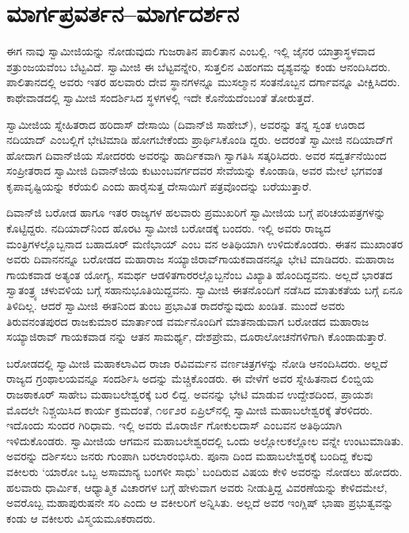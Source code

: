 
\chapter{ಮಾರ್ಗಪ್ರವರ್ತನ–ಮಾರ್ಗದರ್ಶನ}

\noindent

ಈಗ ನಾವು ಸ್ವಾಮೀಜಿಯನ್ನು ನೋಡುವುದು ಗುಜರಾತಿನ ಪಾಲಿತಾನ ಎಂಬಲ್ಲಿ. ಇಲ್ಲಿ ಜೈನರ ಯಾತ್ರಾಸ್ಥಳವಾದ ಶತ್ರುಂಜಯವೆಂಬ ಬೆಟ್ಟವಿದೆ. ಸ್ವಾಮೀಜಿ ಈ ಬೆಟ್ಟವನ್ನೇರಿ, ಸುತ್ತಲಿನ ವಿಹಂಗಮ ದೃಶ್ಯವನ್ನು ಕಂಡು ಆನಂದಿಸಿದರು. ಪಾಲಿತಾನದಲ್ಲಿ ಅವರು ಇತರ ಹಲವಾರು ದೇವ ಸ್ಥಾನಗಳನ್ನೂ ಮುಸಲ್ಮಾನ ಸಂತನೊಬ್ಬನ ದರ್ಗಾವನ್ನೂ ವೀಕ್ಷಿಸಿದರು. ಕಾಥೇವಾಡದಲ್ಲಿ ಸ್ವಾಮೀಜಿ ಸಂದರ್ಶಿಸಿದ ಸ್ಥಳಗಳಲ್ಲಿ ಇದೇ ಕೊನೆಯದೆಂಬಂತೆ ತೋರುತ್ತದೆ.

ಸ್ವಾಮೀಜಿಯ ಸ್ನೇಹಿತರಾದ ಹರಿದಾಸ್ ದೇಸಾಯಿ (ದಿವಾನ್​ಜಿ ಸಾಹೇಬ್​), ಅವರನ್ನು ತನ್ನ ಸ್ವಂತ ಊರಾದ ನದಿಯಾದ್ ಎಂಬಲ್ಲಿಗೆ ಭೇಟಿಮಾಡಿ ಹೋಗಬೇಕೆಂದು ಪ್ರಾರ್ಥಿಸಿಕೊಂಡಿ ದ್ದರು. ಅದರಂತೆ ಸ್ವಾಮೀಜಿ ನದಿಯಾದ್​ಗೆ ಹೋದಾಗ ದಿವಾನ್​ಜಿಯ ಸೋದರರು ಅವರನ್ನು ಹಾರ್ದಿಕವಾಗಿ ಸ್ವಾಗತಿಸಿ ಸತ್ಕರಿಸಿದರು. ಅವರ ಸದ್ವರ್ತನೆಯಿಂದ ಸಂಪ್ರೀತರಾದ ಸ್ವಾಮೀಜಿ ದಿವಾನ್​ಜಿಯ ಕುಟುಂಬವರ್ಗದವರ ಸೇವೆಯನ್ನು ಕೊಂಡಾಡಿ, ಅವರ ಮೇಲೆ ಭಗವಂತ ಕೃಪಾವೃಷ್ಟಿಯನ್ನು ಕರೆಯಲಿ ಎಂದು ಹಾರೈಸುತ್ತ ದೇಸಾಯಿಗೆ ಪತ್ರವೊಂದನ್ನು ಬರೆಯುತ್ತಾರೆ.

ದಿವಾನ್​ಜಿ ಬರೋಡ ಹಾಗೂ ಇತರ ರಾಜ್ಯಗಳ ಹಲವಾರು ಪ್ರಮುಖರಿಗೆ ಸ್ವಾಮೀಜಿಯ ಬಗ್ಗೆ ಪರಿಚಯಪತ್ರಗಳನ್ನು ಕೊಟ್ಟಿದ್ದರು. ನದಿಯಾದ್​ನಿಂದ ಹೊರಟ ಸ್ವಾಮೀಜಿ ಬರೋಡಕ್ಕೆ ಬಂದರು. ಇಲ್ಲಿ ಅವರು ರಾಜ್ಯದ ಮಂತ್ರಿಗಳಲ್ಲೊಬ್ಬನಾದ ಬಹಾದೂರ್ ಮಣಿಭಾಯ್ ಎಂಬ ವನ ಅತಿಥಿಯಾಗಿ ಉಳಿದುಕೊಂಡರು. ಈತನ ಮುಖಾಂತರ ಅವರು ದಿವಾನನನ್ನೂ ಬರೋಡದ ಮಹಾರಾಜ ಸಯ್ಯಾಜಿರಾವ್​ಗಾಯಕವಾಡನನ್ನೂ ಭೇಟಿ ಮಾಡಿದರು. ಮಹಾರಾಜ ಗಾಯಕವಾಡ ಅತ್ಯಂತ ಯೋಗ್ಯ, ಸಮರ್ಥ ಆಡಳಿತಗಾರರಲ್ಲೊಬ್ಬನೆಂಬ ವಿಖ್ಯಾತಿ ಹೊಂದಿದ್ದವನು. ಅಲ್ಲದೆ ಭಾರತದ ಸ್ವಾತಂತ್ರ್ಯ ಚಳುವಳಿಯ ಬಗ್ಗೆ ಸಹಾನುಭೂತಿಯಿದ್ದವನು. ಸ್ವಾಮೀಜಿ ಈತನೊಂದಿಗೆ ನಡೆಸಿದ ಮಾತುಕತೆಯ ಬಗ್ಗೆ ಏನೂ ತಿಳಿದಿಲ್ಲ. ಆದರೆ ಸ್ವಾಮೀಜಿ ಈತನಿಂದ ತುಂಬ ಪ್ರಭಾವಿತ ರಾದರೆನ್ನುವುದು ಖಂಡಿತ. ಮುಂದೆ ಅವರು ತಿರುವನಂತಪುರದ ರಾಜಕುಮಾರ ಮಾರ್ತಾಂಡ ವರ್ಮನೊಂದಿಗೆ ಮಾತನಾಡುವಾಗ ಬರೋಡದ ಮಹಾರಾಜ ಸಯ್ಯಾಜಿರಾವ್ ಗಾಯಕವಾಡ ನನ್ನು ಆತನ ಸಾಮರ್ಥ್ಯ, ದೇಶಪ್ರೇಮ, ದೂರಾಲೋಚನೆಗಳಿಗಾಗಿ ಕೊಂಡಾಡುತ್ತಾರೆ.

ಬರೋಡದಲ್ಲಿ ಸ್ವಾಮೀಜಿ ಮಹಾಕಲಾವಿದ ರಾಜಾ ರವಿವರ್ಮನ ವರ್ಣಚಿತ್ರಗಳನ್ನು ನೋಡಿ ಆನಂದಿಸಿದರು. ಅಲ್ಲದೆ ರಾಜ್ಯದ ಗ್ರಂಥಾಲಯವನ್ನೂ ಸಂದರ್ಶಿಸಿ ಅದನ್ನು ಮೆಚ್ಚಿಕೊಂಡರು. ಈ ವೇಳೆಗೆ ಅವರ ಸ್ನೇಹಿತನಾದ ಲಿಂಬ್ಡಿಯ ರಾಜಠಾಕೂರ್ ಸಾಹೇಬ ಮಹಾಬಲೇಶ್ವರಕ್ಕೆ ಬರ ಲಿದ್ದ. ಅವನನ್ನು ಭೇಟಿ ಮಾಡುವ ಉದ್ದೇಶದಿಂದ, ಪ್ರಾಯಶಃ ಮೊದಲೇ ನಿಶ್ಚಯಿಸಿದ ಕಾರ್ಯ ಕ್ರಮದಂತೆ, ೧೮೯೨ರ ಏಪ್ರಿಲ್​ನಲ್ಲಿ ಸ್ವಾಮೀಜಿ ಮಹಾಬಲೇಶ್ವರಕ್ಕೆ ತೆರಳಿದರು. ಇದೊಂದು ಸುಂದರ ಗಿರಿಧಾಮ. ಇಲ್ಲಿ ಅವರು ಮೊರಾರ್ಜಿ ಗೋಕುಲದಾಸ್ ಎಂಬವನ ಅತಿಥಿಯಾಗಿ ಇಳಿದುಕೊಂಡರು. ಸ್ವಾಮೀಜಿಯ ಆಗಮನ ಮಹಾಬಲೇಶ್ವರದಲ್ಲಿ ಒಂದು ಅಲ್ಲೋಲಕಲ್ಲೋಲ ವನ್ನೇ ಉಂಟುಮಾಡಿತು. ಅವರನ್ನು ದರ್ಶಿಸಲು ಜನರು ಗುಂಪಾಗಿ ಬರಲಾರಂಭಿಸಿರು. ಪೂನಾ ದಿಂದ ಮಹಾಬಲೇಶ್ವರಕ್ಕೆ ಬಂದಿದ್ದ ಕೆಲವು ವಕೀಲರು ‘ಯಾರೋ ಒಬ್ಬ ಅಸಾಮಾನ್ಯ ಬಂಗಳೀ ಸಾಧು’ ಬಂದಿರುವ ವಿಷಯ ಕೇಳಿ ಅವರನ್ನು ನೋಡಲು ಹೋದರು. ಹಲವಾರು ಧಾರ್ಮಿಕ, ಆಧ್ಯಾತ್ಮಿಕ ವಿಚಾರಗಳ ಬಗ್ಗೆ ಹೇಳುವಾಗ ಅವರು ನೀಡುತ್ತಿದ್ದ ವಿವರಣೆಯನ್ನು ಕೇಳಿದಮೇಲೆ, ಅವರೊಬ್ಬ ಮಹಾಪುರುಷನೇ ಸರಿ ಎಂದು ಆ ವಕೀಲರಿಗೆ ಅನ್ನಿಸಿತು. ಅಲ್ಲದೆ ಅವರ ಇಂಗ್ಲಿಷ್ ಭಾಷಾ ಪ್ರಭುತ್ವವನ್ನು ಕಂಡು ಆ ವಕೀಲರು ವಿಸ್ಮಯಮೂಕರಾದರು.

